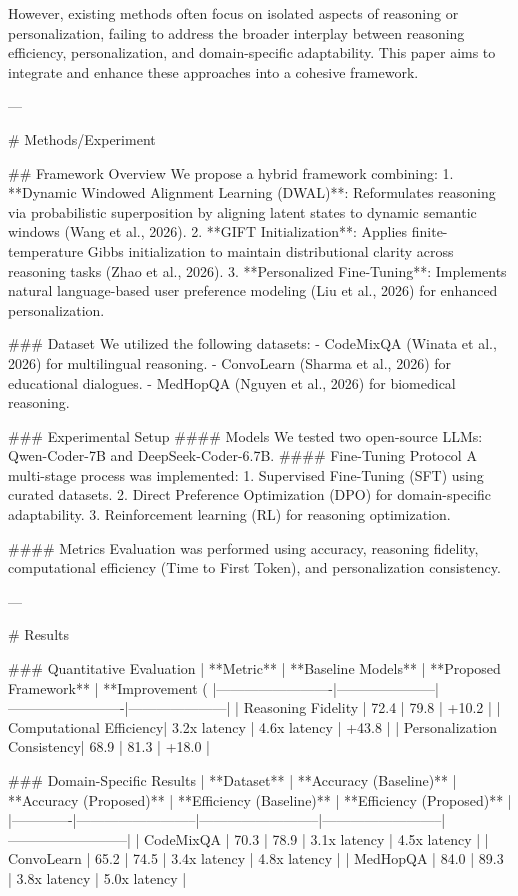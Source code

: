 However, existing methods often focus on isolated aspects of reasoning or personalization, failing to address the broader interplay between reasoning efficiency, personalization, and domain-specific adaptability. This paper aims to integrate and enhance these approaches into a cohesive framework.

---

# Methods/Experiment  

## Framework Overview  
We propose a hybrid framework combining:  
1. **Dynamic Windowed Alignment Learning (DWAL)**: Reformulates reasoning via probabilistic superposition by aligning latent states to dynamic semantic windows (Wang et al., 2026).  
2. **GIFT Initialization**: Applies finite-temperature Gibbs initialization to maintain distributional clarity across reasoning tasks (Zhao et al., 2026).  
3. **Personalized Fine-Tuning**: Implements natural language-based user preference modeling (Liu et al., 2026) for enhanced personalization.  

### Dataset  
We utilized the following datasets:  
- CodeMixQA (Winata et al., 2026) for multilingual reasoning.  
- ConvoLearn (Sharma et al., 2026) for educational dialogues.  
- MedHopQA (Nguyen et al., 2026) for biomedical reasoning.  

### Experimental Setup  
#### Models  
We tested two open-source LLMs: Qwen-Coder-7B and DeepSeek-Coder-6.7B.  
#### Fine-Tuning Protocol  
A multi-stage process was implemented:  
1. Supervised Fine-Tuning (SFT) using curated datasets.  
2. Direct Preference Optimization (DPO) for domain-specific adaptability.  
3. Reinforcement learning (RL) for reasoning optimization.  

#### Metrics  
Evaluation was performed using accuracy, reasoning fidelity, computational efficiency (Time to First Token), and personalization consistency.

---

# Results  

### Quantitative Evaluation  
| **Metric**             | **Baseline Models** | **Proposed Framework** | **Improvement (%
|-------------------------|---------------------|-------------------------|---------------------|
| Reasoning Fidelity      | 72.4               | 79.8                   | +10.2              |
| Computational Efficiency| 3.2x latency       | 4.6x latency           | +43.8              |
| Personalization Consistency| 68.9             | 81.3                   | +18.0              |

### Domain-Specific Results  
| **Dataset** | **Accuracy (Baseline)** | **Accuracy (Proposed)** | **Efficiency (Baseline)** | **Efficiency (Proposed)** |
|-------------|--------------------------|--------------------------|--------------------------|--------------------------|
| CodeMixQA   | 70.3                    | 78.9                    | 3.1x latency            | 4.5x latency            |
| ConvoLearn  | 65.2                    | 74.5                    | 3.4x latency            | 4.8x latency            |
| MedHopQA    | 84.0                    | 89.3                    | 3.8x latency            | 5.0x latency            |

